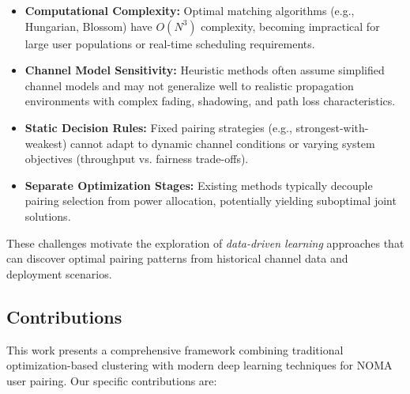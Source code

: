 \begin{itemize}
    \item \textbf{Computational Complexity:} Optimal matching algorithms (e.g., Hungarian, Blossom) have $O(N^3)$ complexity, becoming impractical for large user populations or real-time scheduling requirements.
    \item \textbf{Channel Model Sensitivity:} Heuristic methods often assume simplified channel models and may not generalize well to realistic propagation environments with complex fading, shadowing, and path loss characteristics.
    \item \textbf{Static Decision Rules:} Fixed pairing strategies (e.g., strongest-with-weakest) cannot adapt to dynamic channel conditions or varying system objectives (throughput vs. fairness trade-offs).
    \item \textbf{Separate Optimization Stages:} Existing methods typically decouple pairing selection from power allocation, potentially yielding suboptimal joint solutions.
\end{itemize}

These challenges motivate the exploration of \emph{data-driven learning} approaches that can discover optimal pairing patterns from historical channel data and deployment scenarios.

\subsection{Contributions}

This work presents a comprehensive framework combining traditional optimization-based clustering with modern deep learning techniques for NOMA user pairing. Our specific contributions are:

